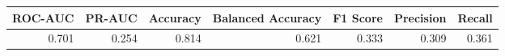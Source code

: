 \begin{tabular}{rrrrrrr}
\toprule
ROC-AUC & PR-AUC & Accuracy & Balanced Accuracy & F1 Score & Precision & Recall \\
\midrule
0.701 & 0.254 & 0.814 & 0.621 & 0.333 & 0.309 & 0.361 \\
\bottomrule
\end{tabular}
